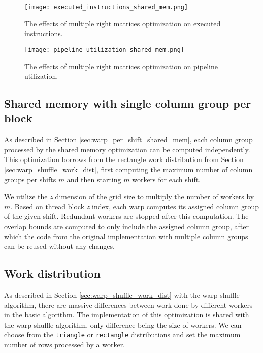\begin{figure}[ht]
	\centering
	\texttt{[image: executed\_instructions\_shared\_mem.png]}
	\caption{The effects of multiple right matrices optimization on executed instructions.}
	\label{fig:executed_instructions_shared_mem}
\end{figure}

\begin{figure}[ht]
	\centering
	\texttt{[image: pipeline\_utilization\_shared\_mem.png]}
	\caption{The effects of multiple right matrices optimization on pipeline utilization.}
	\label{fig:pipeline_utilization_shared_mem}
\end{figure}

\subsection{Shared memory with single column group per block}
\label{sec:column_group_per_worker}
As described in Section \ref{sec:warp_per_shift_shared_mem}, each column group processed by the shared memory optimization can be computed independently. This optimization borrows from the rectangle work distribution from Section \ref{sec:warp_shuffle_work_dist}, first computing the maximum number of column groups per shifts $m$ and then starting $m$ workers for each shift.

We utilize the \textit{z} dimension of the grid size to multiply the number of workers by $m$. Based on thread block \textit{z} index, each warp computes its assigned column group of the given shift. Redundant workers are stopped after this computation. The overlap bounds are computed to only include the assigned column group, after which the code from the original implementation with multiple column groups can be reused without any changes.

\subsection{Work distribution}

As described in Section \ref{sec:warp_shuffle_work_dist} with the warp shuffle algorithm, there are massive differences between work done by different workers in the basic algorithm. The implementation of this optimization is shared with the warp shuffle algorithm, only difference being the size of workers. We can choose from the \texttt{triangle} or \texttt{rectangle} distributions and set the maximum number of rows processed by a worker.

